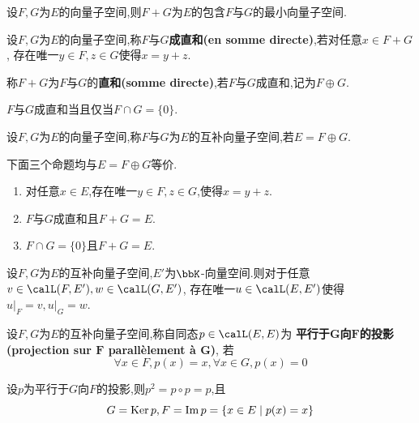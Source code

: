 \begin{prop}
    设$F, G$为$E$的向量子空间,则$F + G$为$E$的包含$F$与$G$的最小向量子空间.
\end{prop}

\begin{deff}
    设$F, G$为$E$的向量子空间,称$F$与$G$\textbf{成直和(en somme directe)},若对任意$x \in F + G$,
    存在唯一$y \in F, z \in G$使得$x = y + z$.
\end{deff}

\begin{rqq}
    称$F + G$为$F$与$G$的\textbf{直和(somme directe)},若$F$与$G$成直和,记为$F \oplus G$.
\end{rqq}

\begin{prop}
    $F$与$G$成直和当且仅当$F \cap G = \{ 0 \}$.
\end{prop}

\begin{deff}
    设$F, G$为$E$的向量子空间,称$F$与$G$为$E$的互补向量子空间,若$E = F \oplus G$.
\end{deff}

\begin{prop}
    下面三个命题均与$E = F \oplus G$等价.
    \begin{enumerate}
        \item 对任意$x \in E$,存在唯一$y \in F, z \in G$,使得$x = y + z$.
        \item $F$与$G$成直和且$F + G = E$.
        \item $F \cap G = \{ 0 \}$且$F + G = E$.
    \end{enumerate}
\end{prop}

\begin{thm}
    设$F, G$为$E$的互补向量子空间,$E'$为$\bbK$-向量空间.则对于任意$v \in \calL(F, E'), w \in \calL(G, E')$,
    存在唯一$u \in \calL(E, E')$使得$u \vert_F = v, u \vert_G = w$.
\end{thm}

\begin{deff}
    设$F,G$为$E$的互补向量子空间,称自同态$p \in \calL(E, E)$为
    \textbf{平行于$\boldsymbol{G}$向$\boldsymbol{F}$的投影(projection sur $\boldsymbol{F}$ parallèlement à $\boldsymbol{G}$)},
    若\[ \forall x \in F, p(x) = x, \forall x \in G, p(x) = 0 \]
\end{deff}

\begin{prop}
    设$p$为平行于$G$向$F$的投影,则$p^2 = p \circ p = p$,且\[ G = \operatorname{Ker} p, F = \operatorname{Im} p = \{ x \in E \mid p(x) = x \} \]
\end{prop}


